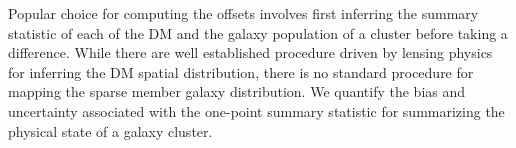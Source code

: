 Popular choice for computing the offsets involves first inferring the summary
statistic of each of the DM and the galaxy population of a cluster before
taking a difference.
While there are well established procedure driven by lensing physics for 
inferring the DM spatial distribution, there is no standard procedure for
mapping the sparse member galaxy distribution. 
We quantify the bias and uncertainty associated with the one-point summary
statistic for summarizing the physical state of a galaxy cluster. 


% 
% 




